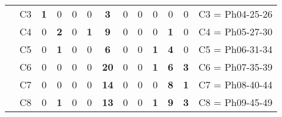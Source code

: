 \begin{table}[H]
{\begin{tabular}{|ccrrrrrrrrrrc|}
\multicolumn{1}{|c|}{}                                      & \multicolumn{1}{c|}{C3} & \multicolumn{1}{c|}{\textbf{1}}  & \multicolumn{1}{c|}{0}  & \multicolumn{1}{c|}{0}  & \multicolumn{1}{c|}{0}  & \multicolumn{1}{c|}{\textbf{3}}  & \multicolumn{1}{c|}{0}  & \multicolumn{1}{c|}{0}  & \multicolumn{1}{c|}{0}  & \multicolumn{1}{c|}{0}  & \multicolumn{1}{c|}{0}  & C3 = Ph04-25-26   \\ \cline{2-13}
\multicolumn{1}{|c|}{}                                      & \multicolumn{1}{c|}{C4} & \multicolumn{1}{c|}{0}  & \multicolumn{1}{c|}{\textbf{2}}  & \multicolumn{1}{c|}{0}  & \multicolumn{1}{c|}{\textbf{1}}  & \multicolumn{1}{c|}{\textbf{9}}  & \multicolumn{1}{c|}{0}  & \multicolumn{1}{c|}{0}  & \multicolumn{1}{c|}{0}  & \multicolumn{1}{c|}{\textbf{1}}  & \multicolumn{1}{c|}{0}  & C4 = Ph05-27-30   \\ \cline{2-13}
\multicolumn{1}{|c|}{}                                      & \multicolumn{1}{c|}{C5} & \multicolumn{1}{c|}{0}  & \multicolumn{1}{c|}{\textbf{1}}  & \multicolumn{1}{c|}{0}  & \multicolumn{1}{c|}{0}  & \multicolumn{1}{c|}{\textbf{6}}  & \multicolumn{1}{c|}{0}  & \multicolumn{1}{c|}{0}  & \multicolumn{1}{c|}{\textbf{1}}  & \multicolumn{1}{c|}{\textbf{4}}  & \multicolumn{1}{c|}{0}  & C5 = Ph06-31-34   \\ \cline{2-13}
\multicolumn{1}{|c|}{}                                      & \multicolumn{1}{c|}{C6} & \multicolumn{1}{c|}{0}  & \multicolumn{1}{c|}{0}  & \multicolumn{1}{c|}{0}  & \multicolumn{1}{c|}{0}  & \multicolumn{1}{c|}{\textbf{20}} & \multicolumn{1}{c|}{0}  & \multicolumn{1}{c|}{0}  & \multicolumn{1}{c|}{\textbf{1}}  & \multicolumn{1}{c|}{\textbf{6}}  & \multicolumn{1}{c|}{\textbf{3}}  & C6 = Ph07-35-39   \\ \cline{2-13}
\multicolumn{1}{|c|}{}                                      & \multicolumn{1}{c|}{C7} & \multicolumn{1}{c|}{0}  & \multicolumn{1}{c|}{0}  & \multicolumn{1}{c|}{0}  & \multicolumn{1}{c|}{0}  & \multicolumn{1}{c|}{\textbf{14}} & \multicolumn{1}{c|}{0}  & \multicolumn{1}{c|}{0}  & \multicolumn{1}{c|}{0}  & \multicolumn{1}{c|}{\textbf{8}}  & \multicolumn{1}{c|}{\textbf{1}}  & C7 = Ph08-40-44   \\ \cline{2-13}
\multicolumn{1}{|c|}{}                                      & \multicolumn{1}{c|}{C8} & \multicolumn{1}{c|}{0}  & \multicolumn{1}{c|}{\textbf{1}}  & \multicolumn{1}{c|}{0}  & \multicolumn{1}{c|}{0}  & \multicolumn{1}{c|}{\textbf{13}} & \multicolumn{1}{c|}{0}  & \multicolumn{1}{c|}{0}  & \multicolumn{1}{c|}{\textbf{1}}  & \multicolumn{1}{c|}{\textbf{9}}  & \multicolumn{1}{c|}{\textbf{3}}  & C8 = Ph09-45-49   \\ \cline{2-13}

\end{tabular}}
\end{table}
